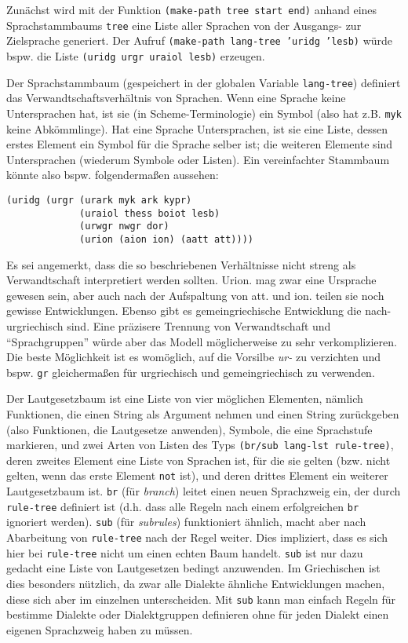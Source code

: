 \documentclass[12pt,a4paper,normalheadings]{scrartcl}
\def\tt#1{\texttt{#1}}
\begin{document}
Zunächst wird mit der Funktion \tt{(make-path tree start end)} anhand
eines Sprachstammbaums \tt{tree}
eine Liste aller Sprachen von der Ausgangs- zur Zielsprache generiert.
Der Aufruf \tt{(make-path lang-tree 'uridg 'lesb)} würde bspw.
die Liste \tt{(uridg urgr uraiol lesb)} erzeugen.

Der Sprachstammbaum (gespeichert in der globalen Variable \tt{lang-tree})
definiert das Verwandtschaftsverhältnis von Sprachen.
Wenn eine Sprache keine Untersprachen hat,
ist sie (in Scheme-Terminologie) ein Symbol
(also hat z.B. \tt{myk} keine Abkömmlinge).
Hat eine Sprache Untersprachen,
ist sie eine Liste, dessen erstes Element ein Symbol für die Sprache selber ist;
die weiteren Elemente sind Untersprachen (wiederum Symbole oder Listen).
Ein vereinfachter Stammbaum könnte also bspw. folgendermaßen aussehen:
\begin{verbatim}
(uridg (urgr (urark myk ark kypr)
             (uraiol thess boiot lesb)
             (urwgr nwgr dor)
             (urion (aion ion) (aatt att))))
\end{verbatim}
Es sei angemerkt,
dass die so beschriebenen Verhältnisse nicht streng als Verwandtschaft
interpretiert werden sollten.
Urion. mag zwar eine Ursprache gewesen sein,
aber auch nach der Aufspaltung von att. und ion. teilen sie
noch gewisse Entwicklungen.
Ebenso gibt es gemeingriechische Entwicklung die nach-urgriechisch sind.
Eine präzisere Trennung von Verwandtschaft und ``Sprachgruppen''
würde aber das Modell möglicherweise zu sehr verkomplizieren.
Die beste Möglichkeit ist es womöglich,
auf die Vorsilbe \textit{ur-} zu verzichten und bspw. \tt{gr}
gleichermaßen für urgriechisch und gemeingriechisch zu verwenden.

Der Lautgesetzbaum ist eine Liste von vier möglichen Elementen, nämlich
Funktionen, die einen String als Argument nehmen und einen String zurückgeben
(also Funktionen, die Lautgesetze anwenden),
Symbole, die eine Sprachstufe markieren,
und zwei Arten von Listen des Typs \tt{(br/sub lang-lst rule-tree)},
deren zweites Element eine Liste von Sprachen ist,
für die sie gelten (bzw. nicht gelten, wenn das erste Element \tt{not} ist),
und deren drittes Element ein weiterer Lautgesetzbaum ist.
\tt{br} (für \emph{branch}) leitet einen neuen Sprachzweig ein,
der durch \tt{rule-tree} definiert ist
(d.h. dass alle Regeln nach einem erfolgreichen \tt{br} ignoriert werden).
\tt{sub} (für \emph{subrules}) funktioniert ähnlich,
macht aber nach Abarbeitung von \tt{rule-tree}
nach der Regel weiter.
Dies impliziert,
dass es sich hier bei \tt{rule-tree} nicht um einen echten Baum handelt.
\tt{sub} ist nur dazu gedacht eine Liste von Lautgesetzen bedingt anzuwenden.
Im Griechischen ist dies besonders nützlich,
da zwar alle Dialekte ähnliche Entwicklungen machen,
diese sich aber im einzelnen unterscheiden.
Mit \tt{sub} kann man einfach Regeln für bestimme Dialekte oder
Dialektgruppen definieren ohne für jeden Dialekt einen eigenen Sprachzweig
haben zu müssen.
\end{document}
